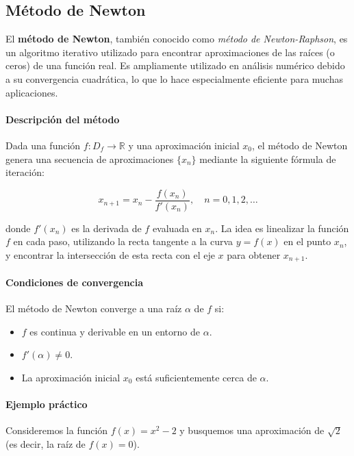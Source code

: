 \documentclass[12pt, a4paper]{article}
\theoremstyle{rioplatense}
\begin{document}
\subsection{Método de Newton}

El \textbf{método de Newton}, también conocido como \textit{método de Newton-Raphson}, es un algoritmo iterativo utilizado para encontrar aproximaciones de las raíces (o ceros) de una función real. Es ampliamente utilizado en análisis numérico debido a su convergencia cuadrática, lo que lo hace especialmente eficiente para muchas aplicaciones.

\paragraph{Descripción del método}
Dada una función \( f: D_f \to \mathbb{R} \) y una aproximación inicial \( x_0 \), el método de Newton genera una secuencia de aproximaciones \( \{x_n\} \) mediante la siguiente fórmula de iteración:

\[
x_{n+1} = x_n - \frac{f(x_n)}{f'(x_n)}, \quad n = 0, 1, 2, \ldots
\]

donde \( f'(x_n) \) es la derivada de \( f \) evaluada en \( x_n \). La idea es linealizar la función \( f \) en cada paso, utilizando la recta tangente a la curva \( y = f(x) \) en el punto \( x_n \), y encontrar la intersección de esta recta con el eje \( x \) para obtener \( x_{n+1} \).

\paragraph{Condiciones de convergencia}
El método de Newton converge a una raíz \( \alpha \) de \( f \) si:
\begin{itemize}
    \item \( f \) es continua y derivable en un entorno de \( \alpha \).
    \item \( f'(\alpha) \neq 0 \).
    \item La aproximación inicial \( x_0 \) está suficientemente cerca de \( \alpha \).
\end{itemize}

\paragraph{Ejemplo práctico}
Consideremos la función \( f(x) = x^2 - 2 \) y busquemos una aproximación de \( \sqrt{2} \) (es decir, la raíz de \( f(x) = 0 \)).
\end{document}
